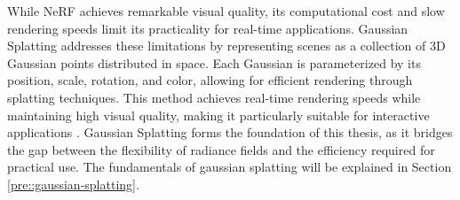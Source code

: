 While NeRF achieves remarkable visual quality, its computational cost and slow rendering speeds limit its practicality for real-time applications. Gaussian Splatting \citep{kerbl2023gsplatt} addresses these limitations by representing scenes as a collection of 3D Gaussian points distributed in space. Each Gaussian is parameterized by its position, scale, rotation, and color, allowing for efficient rendering through splatting techniques. This method achieves real-time rendering speeds while maintaining high visual quality, making it particularly suitable for interactive applications \citep{zwicker2001ewa}. Gaussian Splatting forms the foundation of this thesis, as it bridges the gap between the flexibility of radiance fields and the efficiency required for practical use. The fundamentals of gaussian splatting will be explained in Section \ref{pre::gaussian-splatting}.